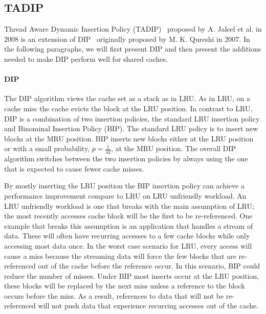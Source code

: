 \subsection{TADIP}
\label{sec:background:algorithms:tadip}

Thread Aware Dynamic Insertion Policy (TADIP)~\cite{Jaleel2008} proposed by A. Jaleel et al. in 2008 is an extension of DIP~\cite{Qureshi2007} originally proposed by M. K. Qureshi in 2007.
In the following paragraphs, we will first present DIP and then present the additions needed to make DIP perform well for shared caches.

\paragraph{DIP}

The DIP algorithm views the cache set as a stack as in LRU.
As in LRU, on a cache miss the cache evicts the block at the LRU position. 
In contrast to LRU, DIP is a combination of two insertion policies, the standard LRU insertion policy and Binominal Insertion Policy (BIP).
The standard LRU policy is to insert new blocks at the MRU position.
BIP inserts new blocks either at the LRU position or with a small probability, $p = \frac{1}{32}$, at the MRU position. The overall DIP algorithm switches between the two insertion policies by always using the one that is expected to cause fewer cache misses.

By mostly inserting the LRU position the BIP insertion policy can achieve a performance improvement compare to LRU on LRU unfriendly workload. 
An LRU unfriendly workload is one that breaks with the main assumption of LRU; the most recently accesses cache block will be the first to be re-referenced.
One example that breaks this assumption is an application that handles a stream of data.
These will often have recurring accesses to a few cache blocks while only accessing most data once.
In the worst case scenario for LRU, every access will cause a miss because the streaming data will force the few blocks that are re-referenced out of the cache before the reference occur.
In this scenario, BIP could reduce the number of misses.
Under BIP most inserts occur at the LRU position, these blocks will be replaced by the next miss unless a reference to the block occurs before the miss.
As a result, references to data that will not be re-referenced will not push data that experience recurring accesses out of the cache.

